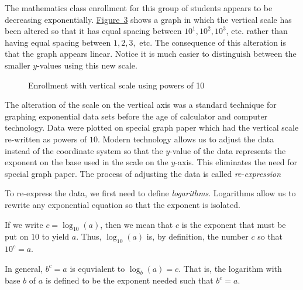 \documentclass[10pt,]{book}
\theoremstyle{plain}
\theoremstyle{definition}
\theoremstyle{definition}
\theoremstyle{definition}
\numberwithin{equation}{section}
\begin{document}
\hypertarget{p-274}{}%
The mathematics class enrollment for this group of students appears to be decreasing exponentially. \hyperref[plot-math-enrollment-log1]{Figure~3} shows a graph in which the vertical scale has been altered so that it has equal spacing between \(10^1, 10^2, 10^3\), etc. rather than having equal spacing between \(1, 2, 3,\) etc.  The consequence of this alteration is that the graph appears linear. Notice it is much easier to distinguish between the smaller \(y\)-values using this new scale.%
\begin{figure}
\centering
{
}
\caption{Enrollment with vertical scale using powers of 10\label{plot-math-enrollment-log1}}
\end{figure}
\hypertarget{p-275}{}%
The alteration of the scale on the vertical axis was a standard technique for graphing exponential data sets before the age of calculator and computer technology. Data were plotted on special graph paper which had the vertical scale re-written as powers of \(10\). Modern technology allows us to adjust the data instead of the coordinate system so that the \(y\)-value of the data represents the exponent on the base used in the scale on the \(y\)-axis. This eliminates the need for special graph paper. The process of adjusting the data is called \emph{re-expression}%
\par
\hypertarget{p-276}{}%
To re-express the data, we first need to define \emph{logarithms}. Logarithms allow us to rewrite any exponential equation so that the exponent is isolated.%
\par
\hypertarget{p-277}{}%
If we write  \(c = \log_{10}(a)\), then we mean that \(c\) is the exponent that must be put on \(10\) to yield \(a\). Thus, \(\log_{10}(a)\) is, by definition, the number \(c\) so that \(10^c = a.\)%
\par
\hypertarget{p-278}{}%
In general, \(b ^ c = a\) is equvialent to \(\log_b(a) = c\). That is, the logarithm with base \(b\) of \(a\) is defined to be the exponent needed such that \(b ^ c = a\).%
\end{document}
